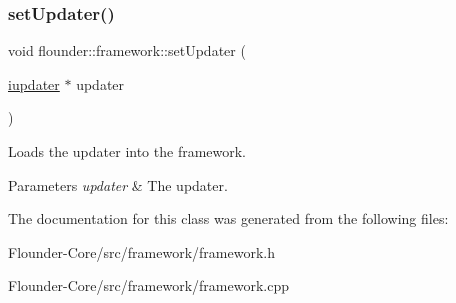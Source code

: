 \subsubsection{\texorpdfstring{set\+Updater()}{setUpdater()}}
{\footnotesize\ttfamily void flounder\+::framework\+::set\+Updater (\begin{DoxyParamCaption}\item[{\hyperlink{classflounder_1_1iupdater}{iupdater} $\ast$}]{updater }\end{DoxyParamCaption})}



Loads the updater into the framework. 


\begin{DoxyParams}{Parameters}
{\em updater} & The updater. \\
\hline
\end{DoxyParams}


The documentation for this class was generated from the following files\+:\begin{DoxyCompactItemize}
\item 
Flounder-\/\+Core/src/framework/framework.\+h\item 
Flounder-\/\+Core/src/framework/framework.\+cpp\end{DoxyCompactItemize}
